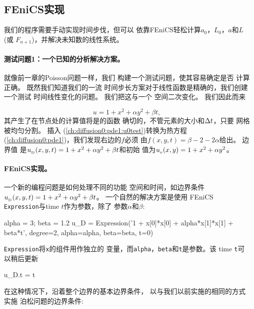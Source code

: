 \subsection{FEniCS实现}
\label{ftut:timedep:diffusion1:impl}

我们的程序需要手动实现时间步伐，但可以
依靠FEniCS轻松计算$a_0$，$L_0$，$a$和$L$(或
$F_{n+1}$)，并解决未知数的线性系统。

\paragraph{测试问题1：一个已知的分析解决方案。}
就像前一章的Poisson问题一样，我们
构建一个测试问题，使其容易确定是否
计算正确。 既然我们知道我们的一流
时间步长方案对于线性函数是精确的，我们创建一个测试
时间线性变化的问题。 我们把这与一个
空间二次变化。 我们因此而来

\begin{equation} u = 1 + x^2 + \alpha y^2 + \beta t,
\label{ch:diffusion0:pde1:u0test}
\end{equation}
其产生了在节点处的计算值将是的函数
确切的，不管元素的大小和$\dt$，只要
网格被均匀分割。 插入
(\ref{ch:diffusion0:pde1:u0test})转换为热方程
(\ref{ch:diffusion0:pde1})，我们发现右边的$f$必须
由$f(x,y,t)=\beta - 2 - 2\alpha$给出。 边界值
是$\ub(x,y,t)= 1 + x^2 + \alpha y^2 + \beta t$和初始
值为$\uI(x,y)= 1 + x^2 + \alpha y^2$。

\paragraph{FEniCS实现。}
一个新的编程问题是如何处理不同的功能
空间和时间，如边界条件$\ub(x,y,
t)= 1 + x^2 + \alpha y^2 + \beta t$。 一个自然的解决方案是使用
FEniCS \texttt{Expression}与time $t$作为参数，除了
参数$\alpha$和$\beta$:


\begin{python}
alpha = 3; beta = 1.2
u_D = Expression('1 + x[0]*x[0] + alpha*x[1]*x[1] + beta*t',
                 degree=2, alpha=alpha, beta=beta, t=0)
\end{python}
\texttt{Expression}将\texttt{x}的组件用作独立的
变量，而\texttt{alpha}，\texttt{beta}和\texttt{t}是参数。该
time \texttt{t}可以稍后更新

\begin{python}
u_D.t = t
\end{python}

在这种情况下，沿着整个边界的基本边界条件，
以与我们以前实施的相同的方式实施
泊松问题的边界条件:

